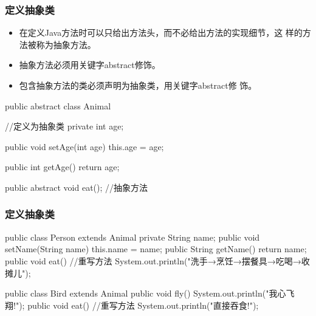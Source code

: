\begin{frame}[fragile] %
  \frametitle{定义抽象类}

  \begin{block}{}
    \begin{itemize}
    \item 在定义Java方法时可以只给出方法头，而不必给出方法的实现细节，这
      样的方法被称为{\Red 抽象方法}。
    \item 抽象方法必须用关键字{\Red abstract}修饰。
    \item 包含抽象方法的类必须声明为抽象类，用关键字{\Red abstract}修
      饰。
    \end{itemize}
  \end{block}


  
  \begin{javaCode}
    public abstract class Animal { //定义为抽象类
      private int age;
      
      public void setAge(int age) {
        this.age = age;
      }
      
      public int getAge(){
        return age;
      }
      
      public abstract void eat(); //抽象方法
    }
  \end{javaCode}
\end{frame}

\begin{frame}[fragile] %
  \frametitle{定义抽象类}

  
  \begin{javaCode}
    public class Person extends Animal {
      private String name;
      public void setName(String name) {
        this.name = name;
      }
      public String getName() {
        return name;
      }
      public void eat() { //重写方法
        System.out.println("洗手→烹饪→摆餐具→吃喝→收摊儿");
      }
    }
  \end{javaCode}

  \begin{javaCode}
    public class Bird extends Animal {
      public void fly(){
        System.out.println("我心飞翔!");
      }
      public void eat(){  //重写方法
        System.out.println("直接吞食!");
      }
    }
  \end{javaCode}
\end{frame}

